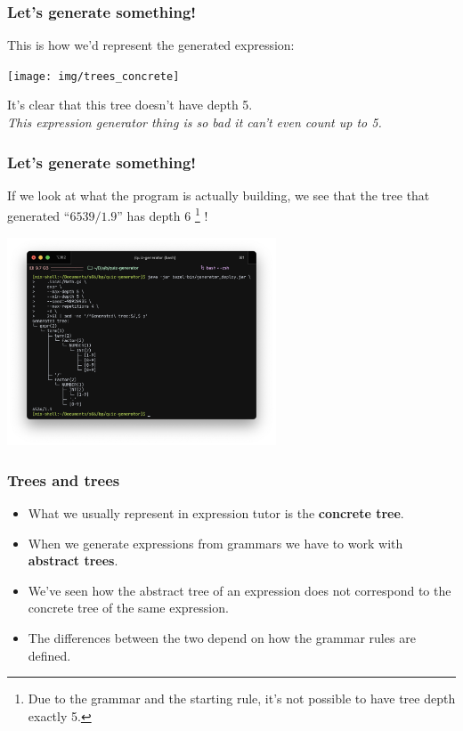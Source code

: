 \documentclass[t,aspectratio=1610]{beamer}
\begin{document}
\begin{frame}
\frametitle{Let's generate something!}
This is how we'd represent the generated expression:
\begin{center}
	\texttt{[image: img/trees\_concrete]}
\end{center}
It's clear that this tree doesn't have depth 5. \\
\textit{This expression generator thing is so bad it can't even count up to 5.}
\end{frame}

\begin{frame}
\frametitle{Let's generate something!}
If we look at what the program is actually building, we see that the
tree that generated ``$ 6539 / 1.9 $'' has depth $ 6 $
\footnote{
	Due to the grammar and the starting rule, it's not possible
	to have tree depth exactly 5.
} !
\begin{center}
	\includegraphics[width=0.6\textwidth]{img/trees_abstract} \\
\end{center}
\end{frame}

\begin{frame}
\frametitle{Trees and trees}
\begin{itemize}
\item What we usually represent in expression tutor is the
	  \textbf{concrete tree}.
\item When we generate expressions from grammars we have to work with
	  \textbf{abstract trees}.
\item We've seen how the abstract tree of an expression does not correspond
	  to the concrete tree of the same expression.
\item The differences between the two depend on how the grammar rules are
	  defined.
\end{itemize}
\end{frame}
\end{document}
